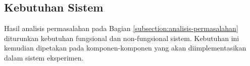 \subsection{Kebutuhan Sistem}
\label{subsection:system-requirements}

Hasil analisis permasalahan pada Bagian \ref{subsection:analisis-permasalahan} diturunkan kebutuhan fungsional dan non-fungsional sistem. Kebutuhan ini kemudian dipetakan pada komponen-komponen yang akan diimplementasikan dalam sistem eksperimen.


